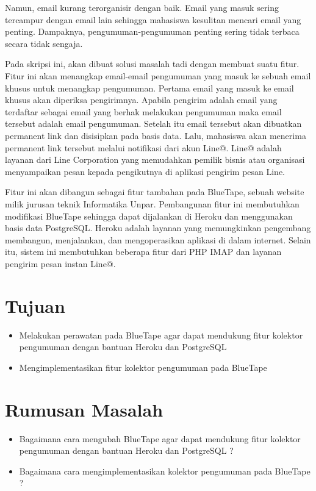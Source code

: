\documentclass[a4paper,twoside]{article}
\begin{document}
Namun, email kurang terorganisir dengan baik. Email yang masuk sering tercampur dengan email lain sehingga mahasiswa kesulitan mencari email yang penting. Dampaknya, pengumuman-pengumuman penting sering tidak terbaca secara tidak sengaja.

Pada skripsi ini, akan dibuat solusi masalah tadi dengan membuat suatu fitur. Fitur ini akan menangkap email-email pengumuman yang masuk ke sebuah email khusus untuk menangkap pengumuman. Pertama email yang masuk ke email khusus akan diperiksa pengirimnya. Apabila pengirim adalah email yang terdaftar sebagai email yang berhak melakukan pengumuman maka email tersebut adalah email pengumuman. Setelah itu email tersebut akan dibuatkan permanent link dan disisipkan pada basis data. Lalu, mahasiswa akan menerima permanent link tersebut melalui notifikasi dari akun Line@. Line@ adalah layanan dari Line Corporation yang memudahkan pemilik bisnis atau organisasi menyampaikan pesan kepada pengikutnya di aplikasi pengirim pesan Line.

Fitur ini akan dibangun sebagai fitur tambahan pada BlueTape, sebuah website milik jurusan teknik Informatika Unpar. Pembangunan fitur ini membutuhkan modifikasi BlueTape sehingga dapat dijalankan di Heroku dan menggunakan basis data PostgreSQL. Heroku adalah layanan yang memungkinkan pengembang membangun, menjalankan, dan mengoperasikan aplikasi di dalam internet. Selain itu, sistem ini membutuhkan beberapa fitur dari PHP IMAP dan layanan pengirim pesan instan Line@.

\section{Tujuan}
\begin{itemize}
\item Melakukan perawatan pada BlueTape agar dapat mendukung fitur kolektor pengumuman dengan bantuan Heroku dan PostgreSQL
\item Mengimplementasikan fitur kolektor pengumuman pada BlueTape
\end{itemize}

\section{Rumusan Masalah}
\begin{itemize}
\item Bagaimana cara mengubah BlueTape agar dapat mendukung fitur kolektor pengumuman dengan bantuan Heroku dan PostgreSQL ?
\item Bagaimana cara mengimplementasikan kolektor pengumuman pada BlueTape ?
\end{itemize}
\end{document}
